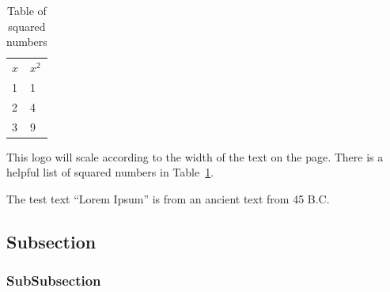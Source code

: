 \begin{table}
  \centering
  \begin{tabular}{ll}
    $x$& $x^{2}$\\
    1 &1\\
    2 &4\\
    3 &9\\
  \end{tabular}
  \caption{Table of squared numbers}\label{tab:numbers}
\end{table}
This logo will scale according to the width of the text on the page.
There is a helpful list of squared numbers in Table~\ref{tab:numbers}.

The test text ``Lorem Ipsum'' is from an ancient text from 45 B.C. \cite{cicero46deFinibus, lipsomwebsite}\\
\lipsum[1-5]
\subsection{Subsection}
\lipsum[6-10]
\subsubsection{SubSubsection}
\lipsum[11-15]
